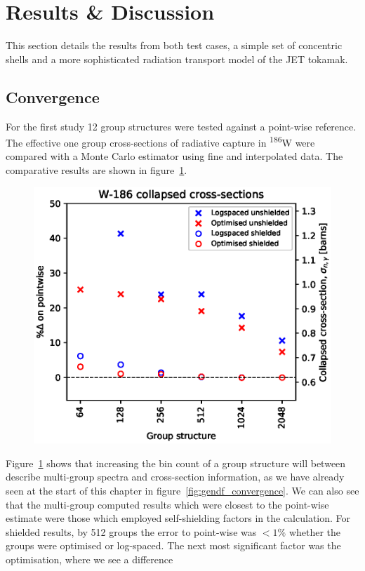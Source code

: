 \section{Results \& Discussion}
\label{sec:results}
This section details the results from both test cases, a simple set of concentric shells and a more sophisticated radiation transport model of the JET tokamak. 

\subsection{Convergence}
For the first study 12 group structures were tested against a point-wise reference. The effective one group cross-sections of radiative capture in \textsuperscript{186}W were compared with a Monte Carlo estimator using fine and interpolated data. The comparative results are shown in figure~\ref{fig:W186_convergence}. 
 
\begin{figure}[H]
  \centering
  \includegraphics[width=0.8\linewidth]{W-186_nbins_convergence_SSF}
  \caption{}
  \label{fig:W186_convergence}
\end{figure}

Figure~\ref{fig:W186_convergence} shows that increasing the bin count of a group structure will between describe multi-group spectra and cross-section information, as we have already seen at the start of this chapter in figure~\ref{fig:gendf_convergence}. We can also see that the multi-group computed results which were closest to the point-wise estimate were those which employed self-shielding factors in the calculation. For shielded results, by 512 groups the error to point-wise was $< 1\%$ whether the groups were optimised or log-spaced. The next most significant factor was the optimisation, where we see a difference 

